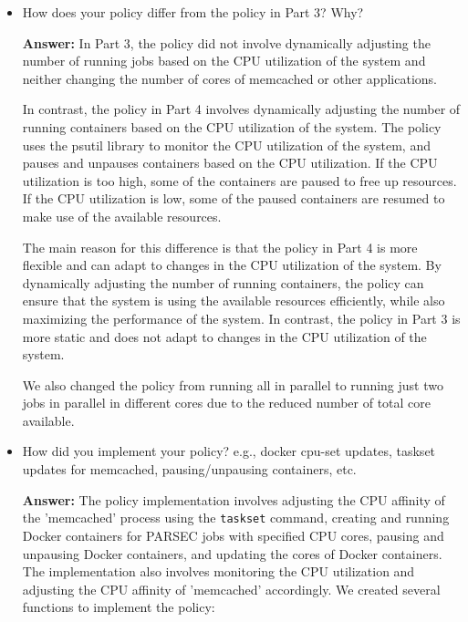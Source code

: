 \begin{enumerate}
\begin{itemize}
    \begin{itemize}
        \item Core 1: , , , 
        \item Core 2 and 3: , , 
    \end{itemize}
    
    \textbf{Why:} %
     There is actually not a reason for this ordering as all jobs are run sequentially and, therefore, there is no contention between them.

\item How does your policy differ from the policy in Part 3? Why?

\textbf{Answer:} %
In Part 3, the policy did not involve dynamically adjusting the number of running jobs based on the CPU utilization of the system and neither changing the number of cores of memcached or other applications.

In contrast, the policy in Part 4 involves dynamically adjusting the number of running containers based on the CPU utilization of the system. The policy uses the psutil library to monitor the CPU utilization of the system, and pauses and unpauses containers based on the CPU utilization. If the CPU utilization is too high, some of the containers are paused to free up resources. If the CPU utilization is low, some of the paused containers are resumed to make use of the available resources.

The main reason for this difference is that the policy in Part 4 is more flexible and can adapt to changes in the CPU utilization of the system. By dynamically adjusting the number of running containers, the policy can ensure that the system is using the available resources efficiently, while also maximizing the performance of the system. In contrast, the policy in Part 3 is more static and does not adapt to changes in the CPU utilization of the system.

We also changed the policy from running all in parallel to running just two jobs in parallel in different cores due to the reduced number of total core available.

\item How did you implement your policy? e.g., docker cpu-set updates, taskset updates for memcached, pausing/unpausing containers, etc.

\textbf{Answer:} The policy implementation involves adjusting the CPU affinity of the 'memcached' process using the \texttt{taskset} command, creating and running Docker containers for PARSEC jobs with specified CPU cores, pausing and unpausing Docker containers, and updating the cores of Docker containers. The implementation also involves monitoring the CPU utilization and adjusting the CPU affinity of 'memcached' accordingly.
We created several functions to implement the policy:


\end{itemize}
\end{enumerate}
